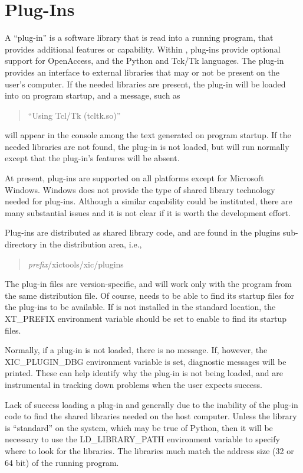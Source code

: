 \section{Plug-Ins}
A ``plug-in'' is a software library that is read into a running
program, that provides additional features or capability.  Within
{\Xic}, plug-ins provide optional support for
OpenAccess, and
the Python and Tck/Tk languages.  The plug-in provides an interface to
external libraries that may or not be present on the user's computer. 
If the needed libraries are present, the plug-in will be loaded into
{\Xic} on program startup, and a message, such as
\begin{quote}
``{\vt Using Tcl/Tk (tcltk.so)}''
\end{quote}
will appear in the console among the text generated on program
startup.  If the needed libraries are not found, the plug-in is not
loaded, but {\Xic} will run normally except that the plug-in's
features will be absent.

At present, plug-ins are supported on all platforms except for
Microsoft Windows.  Windows does not provide the type of shared
library technology needed for plug-ins.  Although a similar capability
could be instituted, there are many substantial issues and it is not
clear if it is worth the development effort.

Plug-ins are distributed as shared library code, and are found in the
{\vt plugins} sub-directory in the distribution area, i.e.,
\begin{quote}
{\it prefix\/}{\vt /xictools/xic/plugins}
\end{quote}
The plug-in files are version-specific, and will work {\cb only} with
the program from the same distribution file.  Of course, {\Xic} needs
to be able to find its startup files for the plug-ins to be available. 
If {\Xic} is not installed in the standard location, the {\et
XT\_PREFIX} environment variable should be set to enable {\Xic} to
find its startup files.

Normally, if a plug-in is not loaded, there is no message.  If,
however, the {\et XIC\_PLUGIN\_DBG} environment variable is set,
diagnostic messages will be printed.  These can help identify why the
plug-in is not being loaded, and are instrumental in tracking down
problems when the user expects success.

Lack of success loading a plug-in and generally due to the inability
of the plug-in code to find the shared libraries needed on the host
computer.  Unless the library is ``standard'' on the system, which may
be true of Python, then it will be necessary to use the {\et
LD\_LIBRARY\_PATH} environment variable to specify where to look for
the libraries.  The libraries much match the address size (32 or 64
bit) of the running {\Xic} program.

